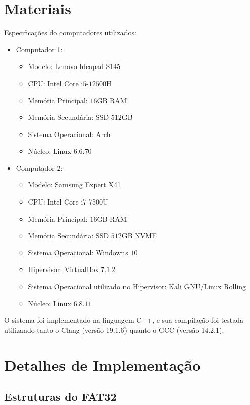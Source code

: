 \documentclass[
    12pt,				%
    oneside,   	        %
    a4paper,			%
    english,			%
    french,				%
    spanish,			%
    brazil,				%
    ]{pacotes/abntex2}
\begin{document}
\section{Materiais}
\label{sec:materiais}


Especificações do computadores utilizados:  

\begin{itemize}
  \item Computador 1:
  \begin{itemize}
    \item Modelo: Lenovo Ideapad S145
    \item CPU: Intel Core i$5$-$12500$H
    \item Memória Principal: $16$GB RAM
    \item Memória Secundária: SSD $512$GB
    \item Sistema Operacional: Arch
  \item Núcleo: Linux $6.6.70$ 
  \end{itemize}
  \item Computador 2:
  \begin{itemize}
    \item Modelo: Samsung Expert X41
    \item CPU: Intel Core i7 7500U
    \item Memória Principal: $16$GB RAM
    \item Memória Secundária: SSD $512$GB NVME
    \item Sistema Operacional: Windowns $10$
    \item Hipervisor: VirtualBox $7.1.2$
    \item Sistema Operacional utilizado no Hipervisor: Kali GNU/Linux Rolling
    \item Núcleo: Linux $6.8.11$
  \end{itemize}
\end{itemize}

O sistema foi implementado na linguagem C++, e sua compilação foi testada utilizando tanto o Clang (versão 19.1.6) quanto o GCC (versão 14.2.1).

\section{Detalhes de Implementação}
\label{sec:implementacao}

\subsection{Estruturas do FAT32}
\label{subsubsec:estrutura_fat}
\end{document}
